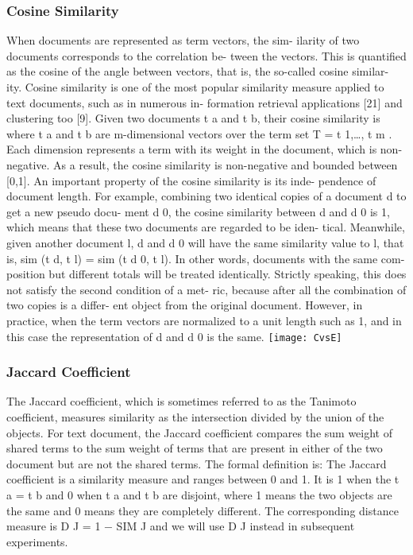 \documentclass{VUMIFInfKursinis}
\begin{document}
\subsubsection{Cosine Similarity}
When documents are represented as term vectors, the sim- ilarity of two documents corresponds to the correlation be- tween the vectors. This is quantified as the cosine of the angle between vectors, that is, the so-called cosine similar- ity. Cosine similarity is one of the most popular similarity measure applied to text documents, such as in numerous in- formation retrieval applications [21] and clustering too [9].
Given two documents t a and t b, their cosine similarity is
where t a and t b are m-dimensional vectors over the term set T = {t 1,\ldots, t m }. Each dimension represents a term with its weight in the document, which is non-negative. As a result, the cosine similarity is non-negative and bounded between [0,1].
An important property of the cosine similarity is its inde- pendence of document length. For example, combining two identical copies of a document d to get a new pseudo docu- ment d 0, the cosine similarity between d and d 0 is 1, which means that these two documents are regarded to be iden- tical. Meanwhile, given another document l, d and d 0 will have the same similarity value to l, that is, sim (t d, t l) = sim (t d 0, t l). In other words, documents with the same com- position but different totals will be treated identically. Strictly speaking, this does not satisfy the second condition of a met- ric, because after all the combination of two copies is a differ- ent object from the original document. However, in practice, when the term vectors are normalized to a unit length such as 1, and in this case the representation of d and d 0 is the same.
\texttt{[image: CvsE]}

\subsubsection{Jaccard Coefficient}
The Jaccard coefficient, which is sometimes referred to as the Tanimoto coefficient, measures similarity as the intersection
divided by the union of the objects. For text document, the Jaccard coefficient compares the sum weight of shared terms to the sum weight of terms that are present in either of the two document but are not the shared terms. The formal definition is:
The Jaccard coefficient is a similarity measure and ranges between 0 and 1. It is 1 when the t a = t b and 0 when t a and t b are disjoint, where 1 means the two objects are the same and 0 means they are completely different. The corresponding distance measure is D J = 1 − SIM J and we will use D J instead in subsequent experiments.
\end{document}
